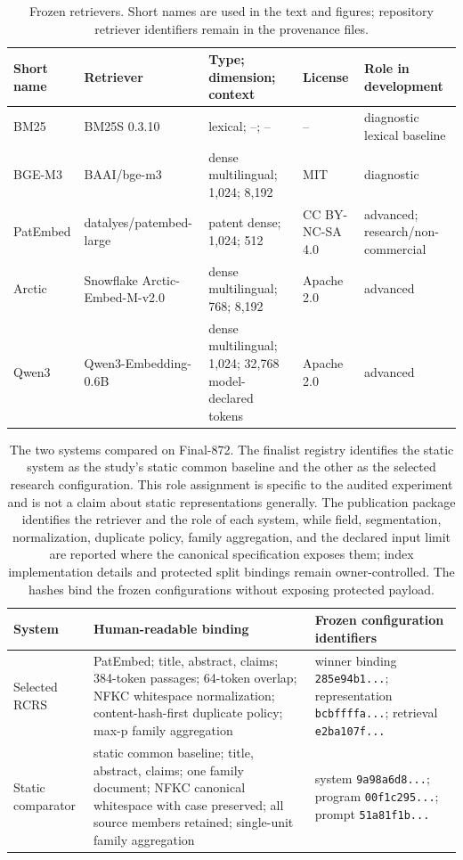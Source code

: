 \documentclass[final,5p,times,twocolumn]{elsarticle}
\newenvironment{widejournal}{\begin{table}[!t]}{\end{table}}
\newcommand{\journalTableFont}{\footnotesize}
\newenvironment{widejournal}{\begin{table}[!htbp]}{\end{table}}
\newcommand{\journalTableFont}{\footnotesize}
\begin{document}
\begin{widejournal}
\caption{Frozen retrievers. Short names are used in the text and figures;
repository retriever identifiers remain in the provenance files.}
\label{tab:retrievers}
\centering
\journalTableFont
\renewcommand{\arraystretch}{0.96}
\begin{tabularx}{\textwidth}{@{}P{1.65cm}P{2.75cm}P{2.9cm}P{2.0cm}Y@{}}
\toprule
Short name & Retriever & Type; dimension; context & License & Role in development \\
\midrule
BM25 & BM25S 0.3.10 & lexical; --; -- & -- & diagnostic lexical baseline
\cite{bm25review2009} \\
BGE-M3 & BAAI/bge-m3 & dense multilingual; 1,024; 8,192 & MIT & diagnostic
\cite{bgem3} \\
PatEmbed & datalyes/\allowbreak patembed-large & patent dense; 1,024; 512 &
CC BY-NC-SA 4.0 & advanced; research/non-commercial \\
Arctic & Snowflake Arctic-Embed-M-v2.0 & dense multilingual; 768; 8,192 &
Apache 2.0 & advanced \cite{arcticembed} \\
Qwen3 & Qwen3-Embedding-0.6B & dense multilingual; 1,024; 32,768 model-declared tokens &
Apache 2.0 & advanced \cite{qwen3embedding} \\
\bottomrule
\end{tabularx}
\end{widejournal}

\begin{widejournal}
\caption{The two systems compared on Final-872. The finalist registry identifies
the static system as the study's static common baseline and the other as the
selected research configuration. This role assignment is specific to the
audited experiment and is not a claim about static representations generally.
The publication package identifies the retriever and the role of each system, while field,
segmentation, normalization, duplicate policy, family aggregation, and the
declared input limit are reported where the canonical specification exposes
them; index implementation details and protected split bindings remain
owner-controlled.
The hashes bind the frozen configurations without exposing protected payload.}
\label{tab:frozen-systems}
\centering
\journalTableFont
\begin{tabularx}{\textwidth}{@{}P{3.0cm}P{3.0cm}Y@{}}
\toprule
System & Human-readable binding & Frozen configuration identifiers \\
\midrule
Selected RCRS & PatEmbed; title, abstract, claims; 384-token passages; 64-token overlap; NFKC whitespace normalization; content-hash-first duplicate policy; max-p family aggregation &
winner binding \texttt{285e94b1...}; representation \texttt{bcbffffa...}; retrieval \texttt{e2ba107f...} \\
Static comparator & static common baseline; title, abstract, claims; one family document; NFKC canonical whitespace with case preserved; all source members retained; single-unit family aggregation &
system \texttt{9a98a6d8...}; program \texttt{00f1c295...}; prompt \texttt{51a81f1b...} \\
\bottomrule
\end{tabularx}
\end{widejournal}
\end{document}
